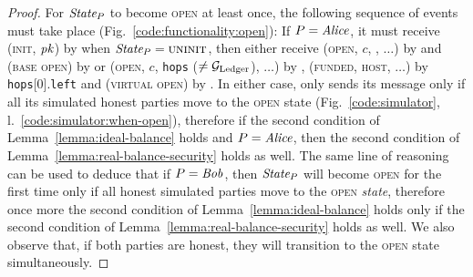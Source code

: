 \begin{proof}
  For $\itistate_P$ to become \textsc{open} at least once, the following
  sequence of events must take place (Fig.~\ref{code:functionality:open}): If $P
  = \mathit{Alice}$, it must receive (\textsc{init}, $\textit{pk}_{}$) by \environment when
  $\itistate_P = \textsc{uninit}$, then either receive (\textsc{open}, $c$,
  \ledger, $\dots$) by \environment and (\textsc{base open}) by \simulator or
  (\textsc{open}, $c$, \texttt{hops} ($\neq \mathcal{G}_{\mathrm{Ledger}}$), $\dots$) by \environment,
  (\textsc{funded}, \textsc{host}, $\dots$) by \texttt{hops}[0].\texttt{left}
  and (\textsc{virtual open}) by \simulator. In either case, \simulator only
  sends its message only if all its simulated honest parties move to the
  \textsc{open} state (Fig.~\ref{code:simulator},
  l.~\ref{code:simulator:when-open}), therefore if the second condition of
  Lemma~\ref{lemma:ideal-balance} holds and $P = \mathit{Alice}$, then the second
  condition of Lemma~\ref{lemma:real-balance-security} holds as well. The same
  line of reasoning can be used to deduce that if $P = \mathit{Bob}$, then $\itistate_P$
  will become \textsc{open} for the first time only if all honest simulated
  parties move to the \textsc{open} \textit{state}, therefore once more the
  second condition of Lemma~\ref{lemma:ideal-balance} holds only if the second
  condition of Lemma~\ref{lemma:real-balance-security} holds as well. We also
  observe that, if both parties are honest, they will transition to the
  \textsc{open} state simultaneously.


\end{proof}
